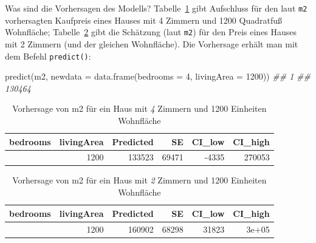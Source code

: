 \documentclass[
  ngerman,
  letterpaper,
  twoside,
  open=any]{scrbook}
\newenvironment{Shaded}{\begin{snugshade}}{\end{snugshade}}
\newcommand{\AttributeTok}[1]{\textcolor[rgb]{0.40,0.45,0.13}{#1}}
\newcommand{\DecValTok}[1]{\textcolor[rgb]{0.68,0.00,0.00}{#1}}
\newcommand{\DocumentationTok}[1]{\textcolor[rgb]{0.37,0.37,0.37}{\textit{#1}}}
\newcommand{\FunctionTok}[1]{\textcolor[rgb]{0.28,0.35,0.67}{#1}}
\newcommand{\NormalTok}[1]{\textcolor[rgb]{0.00,0.23,0.31}{#1}}
\theoremstyle{definition}
\theoremstyle{plain}
\theoremstyle{definition}
\theoremstyle{definition}
\theoremstyle{definition}
\theoremstyle{definition}
\theoremstyle{remark}
\begin{document}
Was sind die Vorhersagen des Modells? Tabelle~\ref{tbl-m2-pred} gibt
Aufschluss für den laut \texttt{m2} vorhersagten Kaufpreis eines Hauses
mit 4 Zimmern und 1200 Quadratfuß Wohnfläche; Tabelle~\ref{tbl-m2-pred2}
gibt die Schätzung (laut \texttt{m2}) für den Preis eines Hauses mit 2
Zimmern (und der gleichen Wohnfläche). Die Vorhersage erhält man mit dem
Befehl \texttt{predict()}:

\begin{Shaded}
\begin{Highlighting}[]
\FunctionTok{predict}\NormalTok{(m2, }\AttributeTok{newdata =} \FunctionTok{data.frame}\NormalTok{(}\AttributeTok{bedrooms =} \DecValTok{4}\NormalTok{, }\AttributeTok{livingArea =} \DecValTok{1200}\NormalTok{))}
\DocumentationTok{\#\#      1 }
\DocumentationTok{\#\# 130464}
\end{Highlighting}
\end{Shaded}

{

\begin{longtable}[]{@{}rrrrrr@{}}

\caption{\label{tbl-m2-pred}Vorhersage von m2 für ein Haus mit \emph{4}
Zimmern und 1200 Einheiten Wohnfläche}

\tabularnewline

\toprule\noalign{}
bedrooms & livingArea & Predicted & SE & CI\_low & CI\_high \\
\midrule\noalign{}
\endhead
\bottomrule\noalign{}
\endlastfoot
4 & 1200 & 133523 & 69471 & -4335 & 270053 \\

\end{longtable}

}

{

\begin{longtable}[]{@{}rrrrrr@{}}

\caption{\label{tbl-m2-pred2}Vorhersage von m2 für ein Haus mit \emph{2}
Zimmern und 1200 Einheiten Wohnfläche}

\tabularnewline

\toprule\noalign{}
bedrooms & livingArea & Predicted & SE & CI\_low & CI\_high \\
\midrule\noalign{}
\endhead
\bottomrule\noalign{}
\endlastfoot
2 & 1200 & 160902 & 68298 & 31823 & 3e+05 \\

\end{longtable}

}
\end{document}

